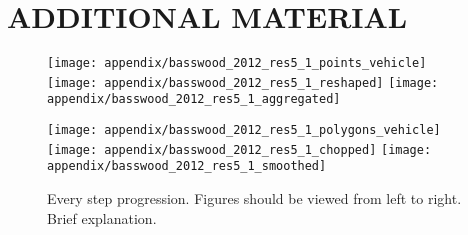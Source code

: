 
\appendixtitle 
\appendix

\unappendixtitle
\singleappendixtitle

\chapter{ADDITIONAL MATERIAL} 


\begin{figure}
    \centering
    \begin{minipage}{0.49\textwidth}
        \centering
        \texttt{[image: appendix/basswood\_2012\_res5\_1\_points\_vehicle]}
        \texttt{[image: appendix/basswood\_2012\_res5\_1\_reshaped]}
        \texttt{[image: appendix/basswood\_2012\_res5\_1\_aggregated]}
    \end{minipage}\hfill
    \begin{minipage}{0.49\textwidth}
        \centering
        \texttt{[image: appendix/basswood\_2012\_res5\_1\_polygons\_vehicle]}
        \texttt{[image: appendix/basswood\_2012\_res5\_1\_chopped]}
        \texttt{[image: appendix/basswood\_2012\_res5\_1\_smoothed]}
    \end{minipage}
    \caption{Every step progression. Figures should be viewed from left to right. Brief explanation.}
    \label{fig:basswood2012-all-steps}
\end{figure}



